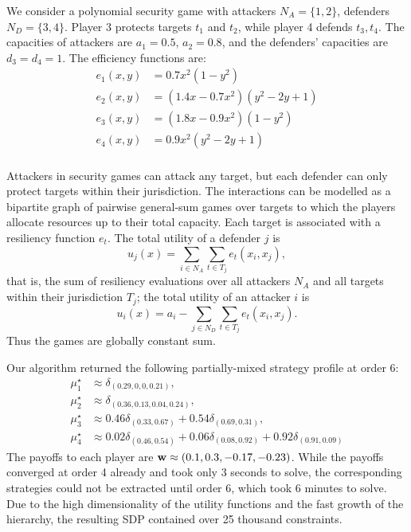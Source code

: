 \begin{example}\label{ex:separable.security}
    We consider a polynomial security game with attackers $N_A=\{1,2\}$, defenders $N_D=\{3,4\}$. Player 3 protects targets $t_1$ and $t_2$, while player 4 defends $t_3,t_4$. The capacities of attackers are $a_1=0.5$, $a_2=0.8$, and the defenders' capacities are $d_3=d_4=1$. The efficiency functions are:
    \begin{equation*}\begin{aligned}
        e_{1}(x,y) &= 0.7x^2(1-y^2)\\
        e_{2}(x,y) &= (1.4x - 0.7x^2)(y^2 -2y +1)\\
        e_{3}(x,y) &= (1.8x - 0.9x^2)(1-y^2)\\
        e_{4}(x,y) &= 0.9x^2(y^2 -2y +1)\\
    \end{aligned}\end{equation*}

    Attackers in security games can attack any target, but each defender can only protect targets within their jurisdiction. The interactions can be modelled as a bipartite graph of pairwise general-sum games over targets to which the players allocate resources up to their total capacity. Each target is associated with a resiliency function $e_t$. The total utility of a defender $j$ is \[u_j(x)=\sum_{i\in N_A}\sum_{t\in T_j} e_t(x_i, x_j),\] that is, the sum of resiliency evaluations over all attackers $N_A$ and all targets within their jurisdiction $T_j$; the total utility of an attacker $i$ is \[u_i(x)=a_i - \sum_{j\in N_D}\sum_{t\in T_j} e_t(x_i, x_j).\] Thus the games are globally constant sum.

    Our algorithm returned the following partially-mixed strategy profile at order 6:
    \[
    \begin{aligned}
    \mu^\star_1 &\approx \delta_{(0.29, 0, 0, 0.21)}, \\
    \mu^\star_2 &\approx \delta_{(0.36, 0.13, 0.04, 0.24)}, \\
    \mu^\star_3 &\approx 0.46\delta_{(0.33, 0.67)} + 0.54\delta_{(0.69, 0.31)}, \\
    \mu^\star_4 &\approx 0.02\delta_{(0.46, 0.54)} + 0.06\delta_{(0.08, 0.92)} + 0.92\delta_{(0.91, 0.09)}
    \end{aligned}
    \]
    The payoffs to each player are $\mathbf{w} \approx (0.1, 0.3, -0.17, -0.23)$. While the payoffs converged at order 4 already and took only 3 seconds to solve, the corresponding strategies could not be extracted until order 6, which took 6 minutes to solve. Due to the high dimensionality of the utility functions and the fast growth of the hierarchy, the resulting SDP contained over 25 thousand constraints.
\end{example}
